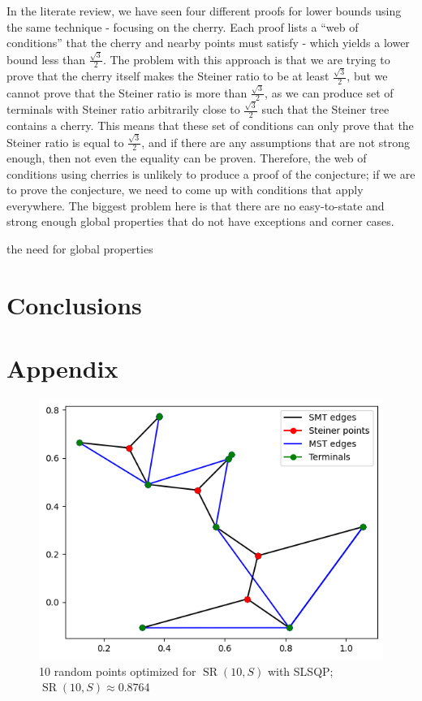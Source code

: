 \documentclass{mpaper}
\begin{document}
In the literate review, we have seen four different proofs for lower bounds using the same technique - focusing on the cherry. Each proof lists a ``web of conditions'' that the cherry and nearby points must satisfy - which yields a lower bound less than $\frac{\sqrt{3}}{2}$. The problem with this approach is that we are trying to prove that the cherry itself makes the Steiner ratio to be at least $\frac{\sqrt{3}}{2}$, but we cannot prove that the Steiner ratio is more than  $\frac{\sqrt{3}}{2}$, as we can produce set of terminals with Steiner ratio arbitrarily close to $\frac{\sqrt{3}}{2}$ such that the Steiner tree contains a cherry. This means that  these set of conditions can only prove that the Steiner ratio is equal to  $\frac{\sqrt{3}}{2}$, and if there are any assumptions that are not strong enough, then not even the equality can be proven. Therefore, the web of conditions using cherries is unlikely to produce a proof of the conjecture; if we are to prove the conjecture, we need to come up with conditions that apply everywhere. The biggest problem here is that there are no easy-to-state and strong enough global properties that do not have exceptions and corner cases.


the need for global properties

\section{Conclusions}
\section{Appendix}

\begin{figure}[h!]
  \begin{center}
  \includegraphics[scale=0.5]{plot8764.png}
  \end{center}
  \caption{\label{fig:9}10 random points optimized for $\operatorname{SR}(10, S)$ with SLSQP; $\operatorname{SR}(10, S)\approx 0.8764$}
\end{figure}




\end{document}
